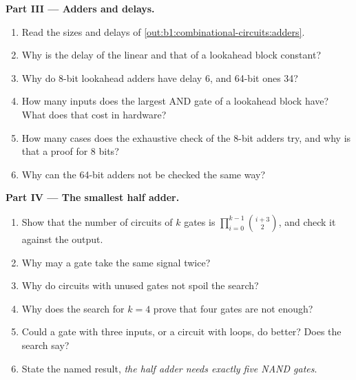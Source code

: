 \begin{problem}
\medskip\noindent\textbf{Part III --- Adders and delays.}
\begin{enumerate}[resume]
\item Read the sizes and delays of \cref{out:b1:combinational-circuits:adders}.
\item Why is the delay of the  linear and that of a lookahead block constant?
\item Why do 8-bit lookahead adders have delay 6, and 64-bit ones 34?
\item How many inputs does the largest AND gate of a lookahead block have? What does that cost in hardware?
\item How many cases does the exhaustive check of the 8-bit adders try, and why is that a proof for 8 bits?
\item Why can the 64-bit adders not be checked the same way?
\end{enumerate}

\medskip\noindent\textbf{Part IV --- The smallest half adder.}
\begin{enumerate}[resume]
\item Show that the number of circuits of $k$ gates is $\prod_{i=0}^{k-1} \binom{i + 3}{2}$, and check it against the
output.
\item Why may a gate take the same signal twice?
\item Why do circuits with unused gates not spoil the search?
\item Why does the search for $k = 4$ prove that four gates are not enough?
\item Could a gate with three inputs, or a circuit with loops, do better? Does the search say?
\item State the named result, \emph{the half adder needs exactly five NAND gates}.
\end{enumerate}
\end{problem}
